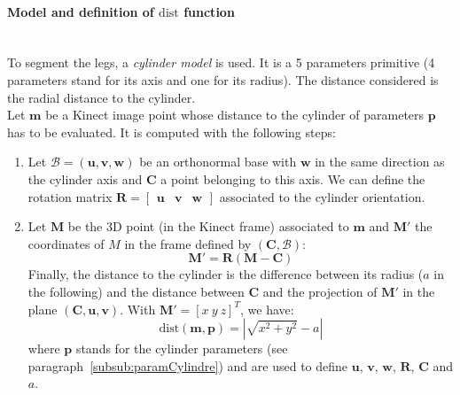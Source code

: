 \documentclass[letterpaper, 10 pt, conference]{ieeeconf}
\newcommand{\CDOK}[2]{{#1}} %
\begin{document}
\paragraph{Model and definition of $\mathrm{dist}$ function}~\\
\label{paragraph:paramCylindre}
To segment the legs, a \emph{cylinder model} is used. It is a 5 parameters primitive (4 parameters stand for its axis and one for its radius). The distance considered is the radial distance to the cylinder. \\
 Let $\mathbf{m}$ be a Kinect image point whose distance to the cylinder of parameters $\mathbf{p}$ has to be evaluated. It is computed with the following steps:
\begin{enumerate}
	\item Let $\mathcal{B}=(\mathbf{u},\mathbf{v},\mathbf{w})$ be an orthonormal base with $\mathbf{w}$ in the same direction \CDOK{as}{than} the cylinder axis and  $\mathbf{C}$ a point belonging to this axis. \CDOK{We can define the rotation matrix $\mathbf{R} = \begin{bmatrix}\mathbf{u} & \mathbf{v} & \mathbf{w}\end{bmatrix}$ associated to the cylinder orientation.}{The rotation matrix $\mathbf{R}$  $(\mathbf{x},\mathbf{y},\mathbf{z})$ initiale à $\mathcal{B}$:
	\begin{equation}
		\mathbf{R} = 
		\begin{bmatrix}
			\mathbf{u} & \mathbf{v} & \mathbf{w}
		\end{bmatrix}
	\end{equation}}
	\item Let $\mathbf{M}$ be the 3D point (in the Kinect frame) associated to $\mathbf{m}$ and $\mathbf{M}'$ the coordinates of $M$ in the frame defined by $(\mathbf{C},\mathcal{B})$:
	\begin{equation}
		\mathbf{M}' = \mathbf{R}\left(\mathbf{M}-\mathbf{C}\right)
	\end{equation}
	Finally, the distance to the cylinder is the difference between its radius ($a$ in the following) and the distance between $\mathbf{C}$ and the projection of $\mathbf{M}'$ in the plane $(\mathbf{C},\mathbf{u},\mathbf{v})$. With $\mathbf{M}'=[x\ y\ z]^T$, we have:
	\begin{equation}
		\mathrm{dist}(\mathbf{m},\mathbf{p}) = |\sqrt{x^2+y^2} - a|
	\end{equation}
	where $\mathbf{p}$ stands for the cylinder parameters (see paragraph~\ref{subsub:paramCylindre}) and are used to define $\mathbf{u}$, $\mathbf{v}$, $\mathbf{w}$, $\mathbf{R}$, $\mathbf{C}$ and $a$.
\end{enumerate}
\end{document}
